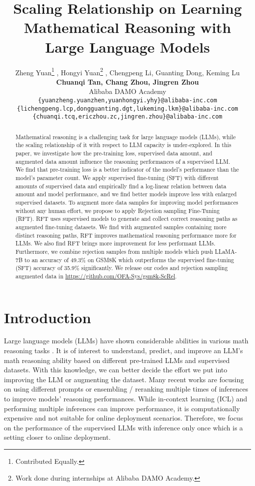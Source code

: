 \documentclass{article} \usepackage{iclr2021_conference,times}
\title{Scaling Relationship on Learning Mathematical Reasoning with Large Language Models}
\author{Zheng Yuan\thanks{Contributed Equally.} ,  Hongyi Yuan\thanks{Work done during internships at Alibaba DAMO Academy.} ,  
Chengpeng Li,
Guanting Dong, Keming Lu \\
\textbf{Chuanqi Tan, Chang Zhou, Jingren Zhou} \\
Alibaba DAMO Academy \\
\texttt{\{yuanzheng.yuanzhen,yuanhongyi.yhy\}@alibaba-inc.com} \\
\texttt{\{lichengpeng.lcp,dongguanting.dgt,lukeming.lkm\}@alibaba-inc.com} \\
\texttt{\{chuanqi.tcq,ericzhou.zc,jingren.zhou\}@alibaba-inc.com} \\
}
\begin{document}
\maketitle

\begin{abstract}
Mathematical reasoning is a challenging task for large language models (LLMs), while the scaling relationship of it with respect to LLM capacity is under-explored.
In this paper, we investigate how the pre-training loss, supervised data amount, and augmented data amount influence the reasoning performances of a supervised LLM.
We find that pre-training loss is a better indicator of the model's performance than the model's parameter count.
We apply supervised fine-tuning (SFT) with different amounts of supervised data and empirically find a log-linear relation between data amount and model performance, and we find better models improve less with enlarged supervised datasets.
To augment more data samples for improving model performances without any human effort, we propose to apply Rejection sampling Fine-Tuning (RFT).
RFT uses supervised models to generate and collect correct reasoning paths as augmented fine-tuning datasets.
We find with augmented samples containing more distinct reasoning paths, RFT improves mathematical reasoning performance more for LLMs.
We also find RFT brings more improvement for less performant LLMs.
Furthermore, we combine rejection samples from multiple models which push LLaMA-7B to an accuracy of 49.3\% on GSM8K which outperforms the supervised fine-tuning (SFT) accuracy of 35.9\% significantly.
We release our codes and rejection sampling augmented data in \url{https://github.com/OFA-Sys/gsm8k-ScRel}.
\end{abstract}

\section{Introduction}
Large language models (LLMs) \citep{anil2023palm,llama2,gpt4} have shown considerable abilities in various math reasoning tasks \citep{saxton2019analysing,gsm8k,lightman2023lets}.
It is of interest to understand, predict, and improve an LLM's math reasoning ability based on different pre-trained LLMs and supervised datasets.
With this knowledge, we can better decide the effort we put into improving the LLM or augmenting the dataset.
Many recent works are focusing on using different prompts \citep{Wei2022ChainOT,yao2023tree} or ensembling / reranking multiple times of inferences \citep{gsm8k,uesato2022solving,wang2023selfconsistency,lightman2023lets} to improve models' reasoning performances. 
While in-context learning (ICL) and performing multiple inferences can improve performance, it is computationally expensive and not suitable for online deployment scenarios. 
Therefore, we focus on the performance of the supervised LLMs with inference only once which is a setting closer to online deployment.
\end{document}
